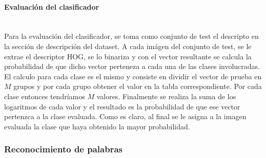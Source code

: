 		\paragraph{Evaluación del clasificador} ~\\

			Para la evaluación del clasificador, se toma como conjunto de test el descripto en la sección de descripción del dataset. A cada imágen del conjunto de test, se le extrae el descriptor HOG, se lo binariza y con el vector resultante se calcula la probabilidad de que dicho vector perteneza a cada una de las clases involucradas. El calculo para cada clase es el mismo y consiste en dividir el vector de prueba en $M$ grupos y por cada grupo obtener el valor en la tabla correspondiente. Por cada clase entonces tendríamos $M$ valores. Finalmente se realiza la suma de los logaritmos de cada valor y el resultado es la probabilidad de que ese vector pertenzca a la clase evaluada. Como es claro, al final se le asigna a la imagen evaluada la clase que haya obtenido la mayor probabilidad.

	\subsubsection{Reconocimiento de palabras}


